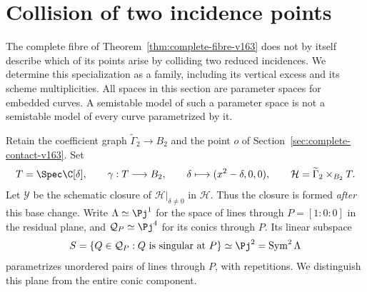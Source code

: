 \section{Collision of two incidence points}
\label{sec:collision-family-v164}
The complete fibre of Theorem~\ref{thm:complete-fibre-v163} does not
by itself describe which of its points arise by colliding two reduced
incidences. We determine this specialization as a family, including
its vertical excess and its scheme multiplicities. All spaces in this
section are parameter spaces for embedded curves. A semistable model
of such a parameter space is not a semistable model of every curve
parametrized by it.

Retain the coefficient graph $\widetilde\Gamma_2\to B_2$ and the
point $o$ of Section~\ref{sec:complete-contact-v163}. Set
\begin{equation}\label{eq:collision-base-v164}
 T=\Spec\C[\delta],\qquad
 \gamma:T\longrightarrow B_2,\qquad
 \delta\longmapsto(x^2-\delta,0,0),\qquad
 \mathcal H=\widetilde\Gamma_2\times_{B_2}T.
\end{equation}
Let $\mathcal Y$ be the schematic closure of
$\mathcal H|_{\delta\ne0}$ in $\mathcal H$. Thus the closure is
formed \emph{after} this base change. Write $\Lambda\simeq\Pj^1$
for the space of lines through $P=[1:0:0]$ in the residual plane,
and $\mathcal Q_P\simeq\Pj^4$ for its conics through $P$.
Its linear subspace
\[
 S=\{Q\in\mathcal Q_P:Q\hbox{ is singular at }P\}\simeq\Pj^2
       =\operatorname{Sym}^2\Lambda
\]
parametrizes unordered pairs of lines through $P$, with repetitions.
We distinguish this plane from the entire conic component.

